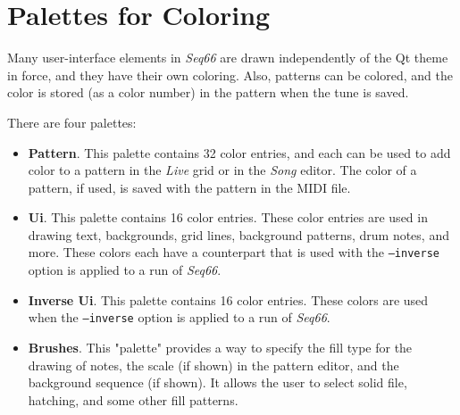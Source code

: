%
%
%

\section{Palettes for Coloring}
\label{sec:palettes}

   Many user-interface elements in \textsl{Seq66} are drawn independently of
   the Qt theme in force, and they have their own coloring.  Also, patterns can
   be colored, and the color is stored (as a color number) in the pattern when
   the tune is saved.

   There are four palettes:

   \begin{itemize}
      \item \textbf{Pattern}.  This palette contains 32 color entries, and each
         can be used to add color to a pattern in the \textsl{Live} grid or in
         the \textsl{Song} editor.  The color of a pattern, if used, is saved
         with the pattern in the MIDI file.
      \item \textbf{Ui}.  This palette contains 16 color entries.  These
         color entries are used in drawing text, backgrounds, grid lines,
         background patterns, drum notes, and more.  These colors each have a
         counterpart that is used with the \texttt{--inverse} option is applied
         to a run of \textsl{Seq66}.
      \item \textbf{Inverse Ui}.  This palette contains 16 color entries.
         These colors are used when the \texttt{--inverse} option is applied
         to a run of \textsl{Seq66}.
      \item \textbf{Brushes}.  This "palette" provides a way to specify the
         fill type for the drawing of notes, the scale (if shown) in the
         pattern editor, and the background sequence (if shown).  It allows the
         user to select solid file, hatching, and some other fill patterns.
   \end{itemize}

